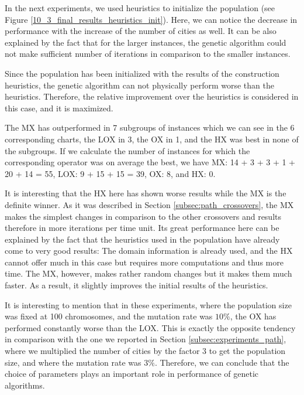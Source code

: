 In the next experiments, we used heuristics to initialize the population (see Figure \ref{10_3_final_results_heuristics_init}). Here, we can notice the decrease in performance with the increase of the number of cities as well. It can be also explained by the fact that for the larger instances, the genetic algorithm could not make sufficient number of iterations in comparison to the smaller instances.\par 

Since the population has been initialized with the results of the construction heuristics, the genetic algorithm can not physically perform worse than the heuristics. Therefore, the relative improvement over the heuristics is considered in this case, and it is maximized.\par 

The MX has outperformed in 7 subgroups of instances which we can see in the 6 corresponding charts, the LOX in 3, the OX in 1, and the HX was best in none of the subgroups.  If we calculate the number of instances for which the corresponding operator was on average the best, we have MX: 14 + 3 + 3 + 1 + 20 + 14 = 55, LOX: 9 + 15 + 15 = 39, OX: 8, and HX: 0.\par 

 It is interesting that the HX here has shown worse results while the MX is the definite winner. As it was described in Section \ref{subsec:path_crossovers}, the MX makes the simplest changes in comparison to the other crossovers and results therefore in more iterations per time unit. Its great performance here can be explained by the fact that the heuristics used in the population have already come to very good results: The domain information is already used, and the HX cannot offer much in this case but requires more computations and thus more time. The MX, however, makes rather random changes but it makes them much faster. As a result, it slightly improves the initial results of the heuristics.\par 	

It is interesting to mention that in these experiments, where the population size was fixed at 100 chromosomes, and the mutation rate was $10\%$, the OX has performed constantly worse than the LOX. This is exactly the opposite tendency in comparison with the one we reported in Section \ref{subsec:experiments_path}, where we multiplied the number of cities by the factor 3 to get the population size, and where the mutation rate was $3\%$. Therefore, we can conclude that the choice of parameters plays an important role in performance of genetic algorithms.\par 

